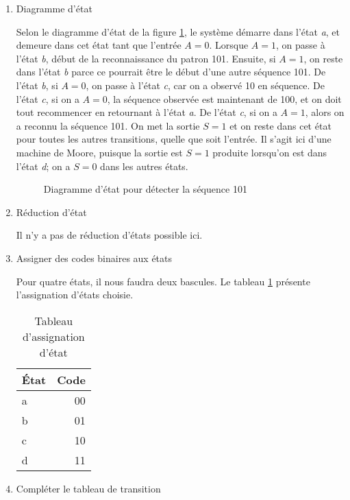 \documentclass[11pt]{article}
\begin{document}
\begin{enumerate}
\item Diagramme d'état
\label{sec:orgcc2f14b}

Selon le diagramme d'état de la figure \ref{fig:org669dc58}, le
système démarre dans l'état \emph{a}, et demeure dans cet état tant que
l'entrée \(A=0\). Lorsque \(A=1\), on passe à l'état \emph{b}, début de la
reconnaissance du patron 101. Ensuite, si \(A=1\), on reste dans
l'état \emph{b} parce ce pourrait être le début d'une autre
séquence 101. De l'état \emph{b}, si \(A=0\), on passe à l'état \emph{c}, car on
a observé 10 en séquence. De l'état \emph{c}, si on a \(A=0\), la séquence
observée est maintenant de 100, et on doit tout recommencer en
retournant à l'état \emph{a}.  De l'état \emph{c}, si on a \(A=1\), alors on a
reconnu la séquence 101. On met la sortie \(S=1\) et on reste dans cet
état pour toutes les autres transitions, quelle que soit l'entrée. Il
s'agit ici d'une machine de Moore, puisque la sortie est \(S=1\)
produite lorsqu'on est dans l'état \emph{d}; on a \(S=0\) dans les autres
états.

\begin{figure}[htbp]
\centering

\caption{\label{fig:org669dc58}Diagramme d'état pour détecter la séquence 101}
\end{figure}


\item Réduction d'état
\label{sec:orga5d0edb}

Il n'y a pas de réduction d'états possible ici.

\item Assigner des codes binaires aux états
\label{sec:org33eda4f}

Pour quatre états, il nous faudra deux bascules.  Le tableau
   \ref{tab:orgbd05d8f} présente l'assignation d'états choisie.

\begin{table}[htbp]
\caption{\label{tab:orgbd05d8f}Tableau d'assignation d'état}
\centering
\begin{tabular}{lr}
État & Code\\
\hline
a & 00\\
b & 01\\
c & 10\\
d & 11\\
\end{tabular}
\end{table}


\item Compléter le tableau de transition
\label{sec:org2ac8d7b}


\end{enumerate}
\end{document}
